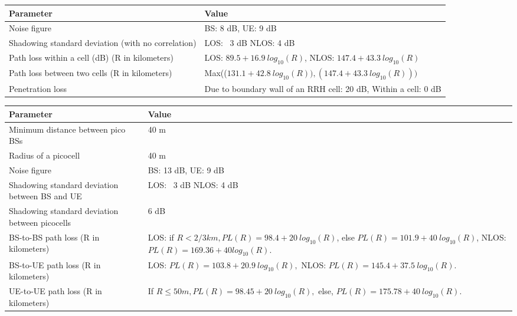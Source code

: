 \documentclass[journal]{IEEEtran}
\begin{document}
\begin {table*} 
\caption {Simulation parameters for an indoor multi-cell scenario} \label{tab1} 
\begin{center}
    \begin{tabular}{| p{2.6 in} | p{3.4 in} |}
    	\hline
		\textbf {Parameter} & \textbf{Value} \\ \hline
		Noise figure & BS: 8 dB, UE: 9 dB \\ \hline
		Shadowing standard deviation (with no correlation) &  LOS:~ 3 dB NLOS: 4 dB \\  \hline
		Path loss within a cell (dB) (R in kilometers) &  LOS: $89.5 + 16.9~log_{10}(R)$, 
		NLOS: $147.4 + 43.3~log_{10}(R)$ \\ \hline
		Path loss between two cells (R in kilometers) & Max(($131.1 + 42.8~log_{10}(R)),(147.4 + 43.3~log_{10}(R)))$ \\ \hline
		Penetration loss & Due to boundary wall of an RRH cell: 20 dB, Within a cell: 0 dB \\ \hline
    \end{tabular}
\end{center}
\end{table*}

\begin {table*} 
\caption {Simulation parameters for an outdoor multi-cell scenario} \label{tab2} 
\begin{center}
    \begin{tabular}{| p{2.6 in} | p{4 in} |}
    	\hline
		\textbf {Parameter} & \textbf{Value} \\ \hline
		Minimum distance between pico BSs & 40 m \\ \hline
		Radius of a picocell & 40 m \\ \hline
		Noise figure & BS: 13 dB, UE: 9 dB \\ \hline
		Shadowing standard deviation between BS and UE &  LOS:~ 3 dB NLOS: 4 dB \\  \hline
		Shadowing standard deviation between picocells &  6 dB \\  \hline
		BS-to-BS path loss (R in kilometers) & LOS: if $R < 2/3 km, PL(R) = 98.4 + 20~log_{10}(R)$, else $PL(R) = 101.9 + 40~log_{10}(R)$, NLOS: $PL(R) = 169.36 + 40 log_{10}(R)$.  \\ \hline
		BS-to-UE path loss (R in kilometers) & LOS: $PL(R) = 103.8 + 20.9~log_{10}(R),$ NLOS: $PL(R) = 145.4 + 37.5~log_{10}(R)$.  \\ \hline
		UE-to-UE path loss (R in kilometers) & If $R \leq 50 m, PL(R) = 98.45 + 20~log_{10}(R),$ else,  $PL(R) = 175.78 + 40~log_{10}(R)$.  \\ \hline
    \end{tabular}
\end{center}
\end{table*}
\end{document}
